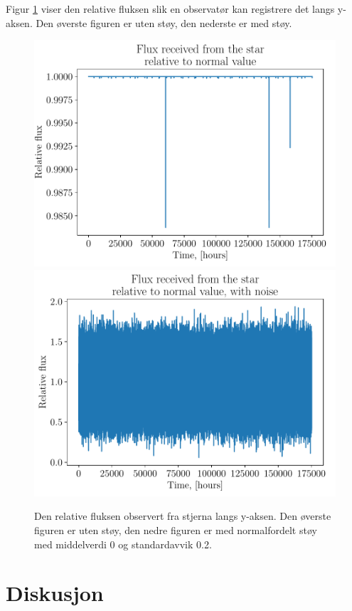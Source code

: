 \documentclass[reprint, english,notitlepage]{revtex4-1}  %
\begin{document}
Figur \ref{fig:flux} viser den relative fluksen slik en observatør kan registrere det langs y-aksen. Den øverste figuren er uten støy, den nederste er med støy.
\begin{figure}
  \includegraphics[width=\linewidth]{../output/plots/flux.pdf}
  \includegraphics[width=\linewidth]{../output/plots/flux_noise.pdf}
  \caption{Den relative fluksen observert fra stjerna langs y-aksen. Den øverste figuren er uten støy, den nedre figuren er med normalfordelt støy med middelverdi 0 og standardavvik 0.2.}
  \label{fig:flux}
\end{figure}




\section{Diskusjon}
\end{document}
